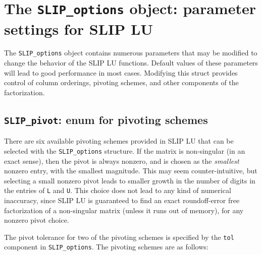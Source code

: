 \documentclass[12pt]{article}
\theoremstyle{definition}
\begin{document}
\cprotect\section{The \verb|SLIP_options| object:
parameter settings for SLIP LU} \label{ss:SLIP_options}

The \verb|SLIP_options| object contains numerous parameters that may be
modified to change the behavior of the SLIP LU functions.  Default values of
these parameters will lead to good performance in most cases.  Modifying this
struct provides control of column orderings, pivoting schemes, and other
components of the factorization.

\cprotect\subsection{\verb|SLIP_pivot|: enum for pivoting schemes}
\label{ss:SLIP_pivot}

There are six available pivoting schemes provided in SLIP LU that can be
selected with the \verb|SLIP_options| structure.  If the matrix is non-singular
(in an exact sense), then the pivot is always nonzero, and is chosen as the
{\em smallest} nonzero entry, with the smallest magnitude.  This may seem
counter-intuitive, but selecting a small nonzero pivot leads to smaller growth
in the number of digits in the entries of \verb|L| and \verb|U|.  This choice
does not lead to any kind of numerical inaccuracy, since SLIP LU is guaranteed
to find an exact roundoff-error free factorization of a non-singular matrix
(unless it runs out of memory), for any nonzero pivot choice.

The pivot tolerance for two of the pivoting schemes is specified by the
\verb|tol| component in \verb|SLIP_options|.  The pivoting schemes are as
follows:
\end{document}
